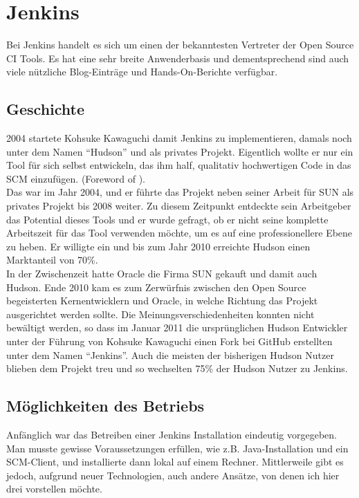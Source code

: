 \pagebreak

\chapter{Jenkins}
Bei Jenkins handelt es sich um einen der bekanntesten Vertreter der Open Source CI Tools. Es hat eine sehr breite Anwenderbasis und dementsprechend sind auch viele nützliche Blog-Einträge und Hands-On-Berichte verfügbar.
\section{Geschichte}
2004 startete Kohsuke Kawaguchi damit Jenkins zu implementieren, damals noch unter dem Namen "`Hudson"' und als privates Projekt. Eigentlich wollte er nur ein Tool für sich selbst entwickeln, das ihm half, qualitativ hochwertigen Code in das SCM einzufügen. (Foreword of \cite{smart2011jenkins}).\\
Das war im Jahr 2004, und er führte das Projekt neben seiner Arbeit für SUN als privates Projekt bis 2008 weiter. Zu diesem Zeitpunkt entdeckte sein Arbeitgeber das Potential dieses Tools und er wurde gefragt, ob er nicht seine komplette Arbeitszeit für das Tool verwenden möchte, um es auf eine professionellere Ebene zu heben. Er willigte ein und bis zum Jahr 2010 erreichte Hudson einen Marktanteil von 70\%.\cite[3]{smart2011jenkins}\\
In der Zwischenzeit hatte Oracle die Firma SUN gekauft und damit auch Hudson. Ende 2010 kam es zum Zerwürfnis zwischen den Open Source begeisterten Kernentwicklern und Oracle, in welche Richtung das Projekt ausgerichtet werden sollte. Die Meinungsverschiedenheiten konnten nicht bewältigt werden, so dass im Januar 2011 die ursprünglichen Hudson Entwickler unter der Führung von Kohsuke Kawaguchi einen Fork bei GitHub erstellten unter dem Namen "`Jenkins"'. Auch die meisten der bisherigen Hudson Nutzer blieben dem Projekt treu und so wechselten 75\% der Hudson Nutzer zu Jenkins. \cite[3-4]{smart2011jenkins}
\section{Möglichkeiten des Betriebs}
Anfänglich war das Betreiben einer Jenkins Installation  eindeutig vorgegeben. Man musste gewisse Voraussetzungen erfüllen, wie z.B. Java-Installation und ein SCM-Client, und installierte dann lokal auf einem Rechner. Mittlerweile gibt es jedoch, aufgrund neuer Technologien, auch andere Ansätze, von denen ich hier drei vorstellen möchte.
